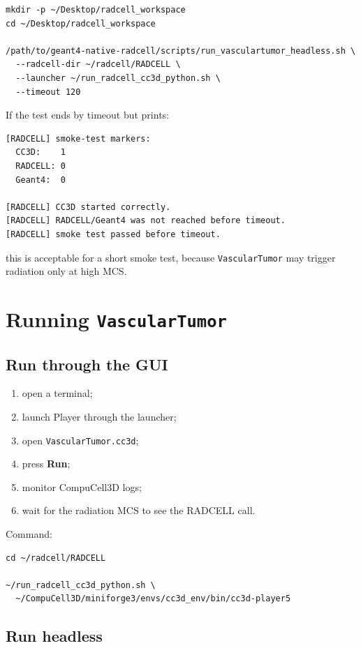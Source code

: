 \documentclass[11pt,a4paper,twoside,pdftex]{refrep}
\begin{document}
\begin{lstlisting}
mkdir -p ~/Desktop/radcell_workspace
cd ~/Desktop/radcell_workspace

/path/to/geant4-native-radcell/scripts/run_vasculartumor_headless.sh \
  --radcell-dir ~/radcell/RADCELL \
  --launcher ~/run_radcell_cc3d_python.sh \
  --timeout 120
\end{lstlisting}

If the test ends by timeout but prints:

\begin{lstlisting}
[RADCELL] smoke-test markers:
  CC3D:    1
  RADCELL: 0
  Geant4:  0

[RADCELL] CC3D started correctly.
[RADCELL] RADCELL/Geant4 was not reached before timeout.
[RADCELL] smoke test passed before timeout.
\end{lstlisting}

this is acceptable for a short smoke test, because \texttt{VascularTumor} may trigger radiation only at high MCS.

\chapter{Running \texttt{VascularTumor}}

\section{Run through the GUI}

\begin{enumerate}
  \item open a terminal;
  \item launch Player through the launcher;
  \item open \texttt{VascularTumor.cc3d};
  \item press \textbf{Run};
  \item monitor CompuCell3D logs;
  \item wait for the radiation MCS to see the RADCELL call.
\end{enumerate}

Command:

\begin{lstlisting}
cd ~/radcell/RADCELL

~/run_radcell_cc3d_python.sh \
  ~/CompuCell3D/miniforge3/envs/cc3d_env/bin/cc3d-player5
\end{lstlisting}

\section{Run headless}
\end{document}
